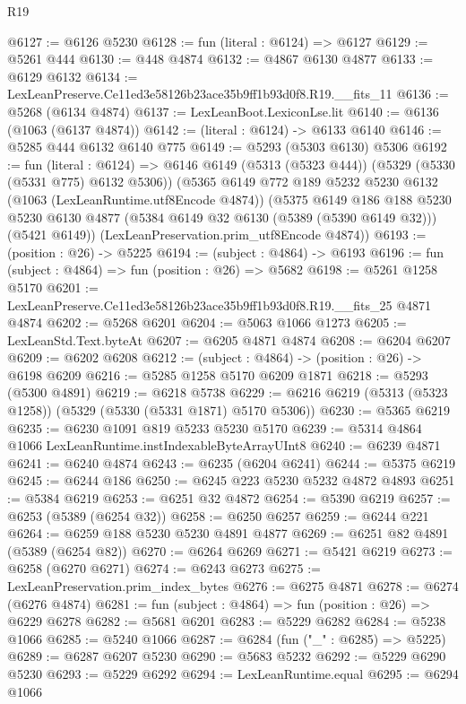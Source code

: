 \begin{lexlean}{R19}
\begin{coremodule}
@6127 := @6126 @5230
@6128 := fun (literal : @6124) => @6127
@6129 := @5261 @444
@6130 := @448 @4874
@6132 := @4867 @6130 @4877
@6133 := @6129 @6132
@6134 := LexLeanPreserve.Ce11ed3e58126b23ace35b9ff1b93d0f8.R19.__fits_11
@6136 := @5268 (@6134 @4874)
@6137 := LexLeanBoot.LexiconLse.lit
@6140 := @6136 (@1063 (@6137 @4874))
@6142 := (literal : @6124) -> @6133 @6140
@6146 := @5285 @444 @6132 @6140 @775
@6149 := @5293 (@5303 @6130) @5306
@6192 := fun (literal : @6124) =>
  @6146
    @6149
    (@5313 (@5323 @444))
    (@5329 (@5330 (@5331 @775) @6132 @5306))
    (@5365
      @6149
      @772
      @189
      @5232
      @5230
      @6132
      (@1063 (LexLeanRuntime.utf8Encode @4874))
      (@5375
        @6149
        @186
        @188
        @5230
        @5230
        @6130
        @4877
        (@5384 @6149 @32 @6130 (@5389 (@5390 @6149 @32)))
        (@5421 @6149))
      (LexLeanPreservation.prim_utf8Encode @4874))
@6193 := (position : @26) -> @5225
@6194 := (subject : @4864) -> @6193
@6196 := fun (subject : @4864) => fun (position : @26) => @5682
@6198 := @5261 @1258 @5170
@6201 := LexLeanPreserve.Ce11ed3e58126b23ace35b9ff1b93d0f8.R19.__fits_25 @4871 @4874
@6202 := @5268 @6201
@6204 := @5063 @1066 @1273
@6205 := LexLeanStd.Text.byteAt
@6207 := @6205 @4871 @4874
@6208 := @6204 @6207
@6209 := @6202 @6208
@6212 := (subject : @4864) -> (position : @26) -> @6198 @6209
@6216 := @5285 @1258 @5170 @6209 @1871
@6218 := @5293 (@5300 @4891)
@6219 := @6218 @5738
@6229 := @6216 @6219 (@5313 (@5323 @1258)) (@5329 (@5330 (@5331 @1871) @5170 @5306))
@6230 := @5365 @6219
@6235 := @6230 @1091 @819 @5233 @5230 @5170
@6239 := @5314 @4864 @1066 LexLeanRuntime.instIndexableByteArrayUInt8
@6240 := @6239 @4871
@6241 := @6240 @4874
@6243 := @6235 (@6204 @6241)
@6244 := @5375 @6219
@6245 := @6244 @186
@6250 := @6245 @223 @5230 @5232 @4872 @4893
@6251 := @5384 @6219
@6253 := @6251 @32 @4872
@6254 := @5390 @6219
@6257 := @6253 (@5389 (@6254 @32))
@6258 := @6250 @6257
@6259 := @6244 @221
@6264 := @6259 @188 @5230 @5230 @4891 @4877
@6269 := @6251 @82 @4891 (@5389 (@6254 @82))
@6270 := @6264 @6269
@6271 := @5421 @6219
@6273 := @6258 (@6270 @6271)
@6274 := @6243 @6273
@6275 := LexLeanPreservation.prim_index_bytes
@6276 := @6275 @4871
@6278 := @6274 (@6276 @4874)
@6281 := fun (subject : @4864) => fun (position : @26) => @6229 @6278
@6282 := @5681 @6201
@6283 := @5229 @6282
@6284 := @5238 @1066
@6285 := @5240 @1066
@6287 := @6284 (fun ("_" : @6285) => @5225)
@6289 := @6287 @6207 @5230
@6290 := @5683 @5232
@6292 := @5229 @6290 @5230
@6293 := @5229 @6292
@6294 := LexLeanRuntime.equal
@6295 := @6294 @1066

\end{coremodule}
\end{lexlean}
